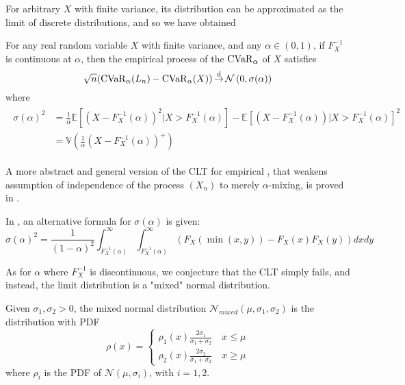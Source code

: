 For arbitrary $X$ with finite variance, its distribution can be approximated as the limit of discrete distributions, and so we have obtained
\begin{theorem}
\label{theorem:clt_cvar}
For any real random variable $X$ with finite variance, and any $\alpha\in(0, 1)$, if $F_X^{-1}$ is continuous  at $\alpha$, then the empirical process of the $\operatorname{CVaR}_\alpha$ of $X$ satisfies
\begin{equation}
\label{eq:clt_cvar_distconv}
\sqrt{n}(\operatorname{CVaR}_\alpha(L_n) - \operatorname{CVaR}_\alpha(X)) \operatorname*{\stackrel{\text {d}}{\to}} \mathcal{N}\left(0, \sigma(\alpha)\right)
\end{equation}
where 
\begin{align}
\begin{split}
\label{eq:clt_cvar}
\sigma(\alpha)^2
 &= \frac 1{\overbar\alpha} \mathbb{E}[(X- F_X^{-1}(\alpha))^2|X > F_X^{-1}(\alpha)] 
   -  \mathbb{E}[(X- F_X^{-1}(\alpha)) | X > F_X^{-1}(\alpha)]^2\\
 &= \mathbb{V}\left(\frac 1 {\overbar\alpha} (X - F_X^{-1}(\alpha))^+\right)
\end{split}
\end{align}


\end{theorem}

A more abstract and general version of the CLT for empirical \cvar, that weakens assumption of independence of the process $(X_n)$ to merely $\alpha$-mixing, is proved in \cite[Theorem 1]{chenNonparametricEstimationExpected2007}.

In \cite[Theorem 3.1]{brazauskasEstimatingConditionalTail2008}, an alternative formula for $\sigma(\alpha)$ is given:
\begin{equation}
\label{eq:alt_cvar_std}
\sigma(\alpha)^2=\frac{1}{(1-\alpha)^{2}} \int_{F_{X}^{-1}(\alpha)}^{\infty} \int_{F_{X}^{-1}(\alpha)}^{\infty}\left(F_{X}(\min(x, y))-F_{X}(x) F_{X}(y)\right)dx dy
\end{equation}

As for $\alpha$ where $F_X^{-1}$ is discontinuous, we conjecture that the CLT simply fails, and instead, the limit distribution is a "mixed" normal distribution. 

\begin{defn}
	\label{defn:mixed_normal}
	Given $\sigma_1, \sigma_2 > 0$, the mixed normal distribution $\mathcal{N}_{mixed}(\mu, \sigma_1, \sigma_2)$ is the distribution with PDF
	\begin{equation}
	\rho(x) = \begin{cases}
	\rho_1(x) \frac{2 \sigma_1}{\sigma_1 + \sigma_2} \quad x\le \mu \\
	\rho_2(x) \frac{2 \sigma_2}{\sigma_1 + \sigma_2}  \quad x \ge \mu
	\end{cases}
	\end{equation}
	where $\rho_i$ is the PDF of $\mathcal{N}(\mu, \sigma_i)$, with $i = 1, 2$.
\end{defn}

